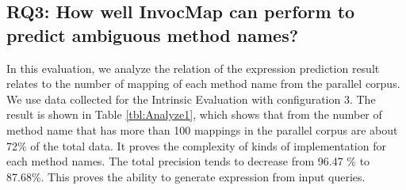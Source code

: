 \subsection{RQ3: How well InvocMap can perform to predict ambiguous method names?}

In this evaluation, we analyze the relation of the expression prediction result relates to the number of mapping of each method name from the parallel corpus. We use data collected for the Intrinsic Evaluation with configuration 3. The result is shown in Table \ref{tbl:Analyze1}, which shows that from the number of method name that has more than 100 mappings in the parallel corpus are about 72\% of the total data. It proves the complexity of kinds of implementation for each method names. The total precision tends to decrease from 96.47 \% to 87.68\%. This proves the ability to generate expression from input queries.








